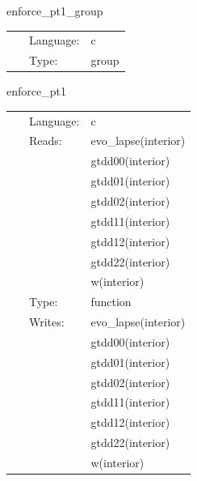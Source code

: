 \vspace{5mm}


\hspace{5mm} enforce\_pt1\_group 

\hspace{5mm}{\it group for function `enforce\_pt1`. generated by einsteinengine. } 


\hspace{5mm}

 \begin{tabular*}{160mm}{cll} 
~ & Language:  & c \\ 
~ & Type:  & group \\ 
\end{tabular*} 


\vspace{5mm}


\hspace{5mm} enforce\_pt1 

\hspace{5mm}{\it function `enforce\_pt1` generated by einsteinengine. } 


\hspace{5mm}

 \begin{tabular*}{160mm}{cll} 
~ & Language:  & c \\ 
~ & Reads:  & evo\_lapse(interior) \\ 
~& ~ &gtdd00(interior)\\ 
~& ~ &gtdd01(interior)\\ 
~& ~ &gtdd02(interior)\\ 
~& ~ &gtdd11(interior)\\ 
~& ~ &gtdd12(interior)\\ 
~& ~ &gtdd22(interior)\\ 
~& ~ &w(interior)\\ 
~ & Type:  & function \\ 
~ & Writes:  & evo\_lapse(interior) \\ 
~& ~ &gtdd00(interior)\\ 
~& ~ &gtdd01(interior)\\ 
~& ~ &gtdd02(interior)\\ 
~& ~ &gtdd11(interior)\\ 
~& ~ &gtdd12(interior)\\ 
~& ~ &gtdd22(interior)\\ 
~& ~ &w(interior)\\ 
\end{tabular*} 


